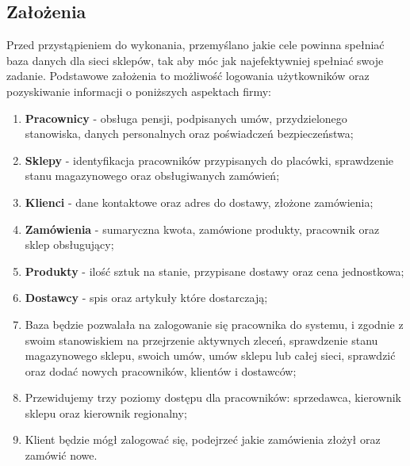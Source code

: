 \documentclass[12pt,a4paper]{article}
\begin{document}
        \subsection{Założenia}
            Przed przystąpieniem do wykonania, przemyślano jakie cele powinna spełniać baza danych dla sieci sklepów, tak aby móc jak najefektywniej spełniać swoje zadanie. Podstawowe założenia to możliwość logowania użytkowników oraz pozyskiwanie informacji o poniższych aspektach firmy:
            \begin{enumerate}
                \item \textbf{Pracownicy} - obsługa pensji, podpisanych umów, przydzielonego stanowiska, danych personalnych oraz poświadczeń bezpieczeństwa;
                \item \textbf{Sklepy} - identyfikacja pracowników przypisanych do placówki, sprawdzenie stanu magazynowego oraz obsługiwanych zamówień;
                \item \textbf{Klienci} - dane kontaktowe oraz adres do dostawy, złożone zamówienia;
                \item \textbf{Zamówienia} - sumaryczna kwota, zamówione produkty, pracownik oraz sklep obsługujący;
                \item \textbf{Produkty} - ilość sztuk na stanie, przypisane dostawy oraz cena jednostkowa;
                \item \textbf{Dostawcy} - spis oraz artykuły które dostarczają;
                \item Baza będzie pozwalała na zalogowanie się pracownika do systemu, i zgodnie z swoim stanowiskiem na przejrzenie aktywnych zleceń, sprawdzenie stanu magazynowego sklepu, swoich umów, umów sklepu lub całej sieci, sprawdzić oraz dodać nowych pracowników, klientów i dostawców;
                \item Przewidujemy trzy poziomy dostępu dla pracowników: sprzedawca, kierownik sklepu oraz kierownik regionalny; 
                \item Klient będzie mógł zalogować się, podejrzeć jakie zamówienia złożył oraz zamówić nowe.
            \end{enumerate}
            
\end{document}
